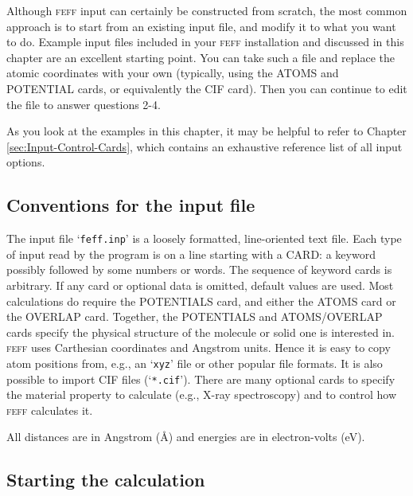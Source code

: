 \documentclass[11pt,oneside]{report} %
\newcommand{\program}[1]{\textsc{#1}}
\newcommand{\feff}{\program{feff}}
\newcommand{\file}[1]{`\texttt{#1}'}
\begin{document}
Although {\feff} input can certainly be constructed from scratch, the most common approach is to start from an existing input file, and modify it to what you want to do.  Example input files included in your {\feff} installation and discussed in this chapter are an excellent starting point.  You can take such a file and replace the atomic coordinates with your own (typically, using the ATOMS and POTENTIAL cards, or equivalently the CIF card).  Then you can continue to edit the file to answer questions 2-4.

As you look at the examples in this chapter, it may be helpful to refer to Chapter \ref{sec:Input-Control-Cards}, which contains an exhaustive reference list of all input options.


\subsection{Conventions for the input file}


The input file \file{feff.inp} is a loosely formatted, line-oriented text file. Each type of input read by the program is on a line 
starting with a CARD:  a keyword possibly followed by some numbers or words.  The sequence of keyword cards is arbitrary. If any card or optional data is omitted,
default values are used.  Most calculations do require the POTENTIALS card, and either the ATOMS card or the OVERLAP card.  Together, the POTENTIALS and ATOMS/OVERLAP cards specify the physical structure of the
molecule or solid one is interested in.  {\feff} uses Carthesian coordinates and Angstrom units.  Hence it is easy to copy atom positions from, e.g., an \file{xyz} file or other popular file formats.  It is also possible to import CIF files (\file{*.cif}).  There are many optional cards to specify the material property to calculate (e.g., X-ray spectroscopy) and to control how {\feff} calculates it. 
 

All distances are in Angstrom ({\AA}) and energies are in electron-volts (eV). 


\subsection{Starting the calculation}
\end{document}
